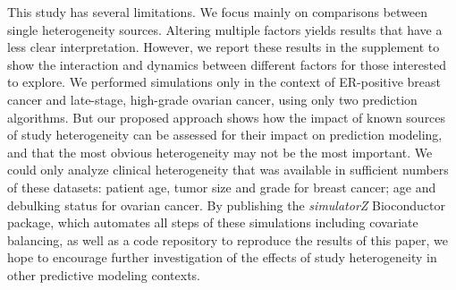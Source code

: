 \documentclass{bioinfo}
\begin{document}
This study has several limitations. 
We focus mainly on comparisons between single heterogeneity sources. 
Altering multiple factors yields results that have a less clear 
interpretation. However, we report these results in the supplement to show
the interaction and dynamics between different factors for those interested to explore.
We performed simulations only in the context of ER-positive breast cancer and
late-stage, high-grade ovarian cancer, using only two prediction algorithms. But our proposed
approach shows how the impact of known sources of study heterogeneity
can be assessed for their impact on prediction modeling, and that the
most obvious heterogeneity may not be the most important. 
We could only analyze clinical
heterogeneity that was available in sufficient numbers of these
datasets: patient age, tumor size and grade for breast cancer;
age and debulking status for ovarian cancer.  By
publishing the \emph{simulatorZ} Bioconductor package, which automates
all steps of these simulations including covariate balancing, as well
as a code repository to reproduce the results of this paper, we hope
to encourage further investigation of the effects of study
heterogeneity in other predictive modeling contexts.

\end{document}
